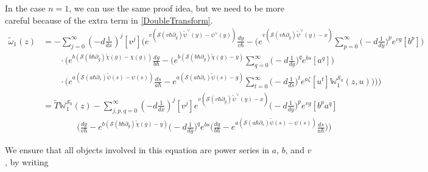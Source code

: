 \documentclass[10pt,a4paper,oneside,no-math,reqno]{amsart}%
\theoremstyle{plain}
\theoremstyle{definition}
\theoremstyle{remark}
\newtheorem{remark}[theorem]{Remark}
\numberwithin{equation}{section}
\newcommand{\mb}[1]{\mathbb{#1}}
\newcommand{\mc}[1]{\mathcal{#1}}
\newcommand{\1}{\mathds{1}}
\newcommand{\<}{\langle}
\renewcommand{\>}{\rangle}
\newcommand{\del}{\partial}
\begin{document}
In the case $n=1$, we can use the same proof idea, but we need to be more careful because of the extra term in \cref{DoubleTransform}.
\begin{equation}
		\begin{split}
			\tilde{\omega}_1 (z)
			&=
			-\sum_{j=0}^\infty (-d \frac{1}{dx})^j [v^j] \Bigg( 
			e^{v ( \mc{S}(v\hbar \del_{y}) \tilde{\psi}^\vee(y) - \psi^\vee (y) )} \frac{dy}{v\hbar}
			- \bigg(e^{v ( \mc{S}(v\hbar \del_y) \tilde{\psi}^\vee (y) - x )} \sum_{p=0}^\infty \big( -d \frac{1}{dy} \big)^p e^{vg} [b^p ] \bigg)
			\\
			& \qquad
			\cdot \Bigg( e^{b ( \mc{S}(b\hbar \del_g) \tilde{\chi}(g) - \chi (g) )} \frac{dg}{b\hbar}
			-\bigg(e^{b ( \mc{S}(b\hbar \del_g) \tilde{\chi}(g) - y )} \sum_{q=0}^\infty \big( -d \frac{1}{dg} \big)^q e^{bs} [a^q ] \bigg)
			\\
			&\qquad 
			\cdot \bigg( e^{a ( \mc{S}(a\hbar \del_s) \tilde{\psi}(s) - \psi (s) )} \frac{ds}{a\hbar}
			- e^{a ( \mc{S}(a\hbar \del_s) \tilde{\psi}(s) - g )} \sum_{t=0}^\infty \big( -d \frac{1}{ds} \big)^t e^{a\zeta} [u^t ] \mb{W}^{\mc{S}_0}_1 (z,u) 
			\bigg) \Bigg) \Bigg)
			\\
			&=
			\tilde{T}\mb{W}^{\mc{S}_0}_1(z)
			-\sum_{j,p,q=0}^\infty (-d \frac{1}{dx})^j [v^j] e^{v ( \mc{S}(v\hbar \del_{y}) \tilde{\psi}^\vee(y) - x)}
			\big( -d \frac{1}{dy} \big)^p e^{vg} [b^p a^q] 
			\\
			&\qquad \qquad
			\Bigg( \frac{dy}{v\hbar} - 
			e^{b ( \mc{S}(b\hbar \del_g) \tilde{\chi}(g) - y )} \big( -d \frac{1}{dg} \big)^q e^{bs}
			\bigg( \frac{dg}{b\hbar}- e^{a ( \mc{S}(a\hbar \del_s) \tilde{\psi}(s) - \psi (s) )} \frac{ds}{a\hbar} \bigg) \Bigg)
		\end{split}
	\end{equation}



We ensure that all objects involved in this equation are power series in $ a$, $ b$, and $v$, by writing
\end{document}
